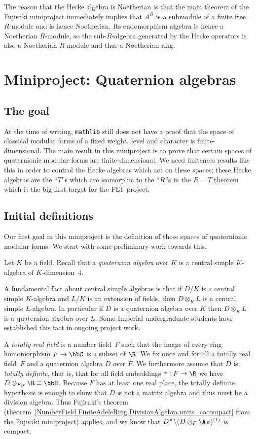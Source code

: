 The reason that the Hecke algebra is Noetherian is that the main theorem of the Fujisaki
miniproject immediately implies that $A^G$ is a submodule of a finite free $R$-module
and is hence Noetherian. Its endomorphism algebra is hence a Noetherian $R$-module,
so the sub-$R$-algebra generated by the Hecke operators is also a Noetherian $R$-module
and thus a Noetherian ring.


\chapter{Miniproject: Quaternion algebras}\label{Quat_alg_project}

\section{The goal}

At the time of writing, {\tt mathlib} still does not have a proof that the space
of classical modular forms of a fixed weight, level and character is finite-dimensional.
The main result in this miniproject is to prove that certain spaces of quaternionic modular forms
are finite-dimensional. We need finiteness results
like this in order to control the Hecke algebras which act on these spaces; these Hecke
algebras are the ``$T$''s which are isomorphic to the ``$R$''s in the $R=T$ theorem which
is the big first target for the FLT project.

\section{Initial definitions}

Our first goal in this miniproject is the definition of these spaces of quaternionic modular forms.
We start with some preliminary work towards this.

Let $K$ be a field. Recall that a \emph{quaternion algebra}
over $K$ is a central simple $K$-algebra of $K$-dimension~4.

A fundamental fact about central simple algebras is that if $D/K$
is a central simple $K$-algebra and $L/K$ is an extension of fields, then $D\otimes_KL$
is a central simple $L$-algebra. In particular if $D$ is a quaternion algebra over $K$
then $D\otimes_KL$ is a quaternion algebra over $L$. Some Imperial undergraduate students have established
this fact in ongoing project work.

A \emph{totally real field} is a number field~$F$ such that the image of every ring
homomorphism $F\to\bbC$ is a subset of $\R$. We fix once and for all a totally real field~$F$ and a
quaternion algebra $D$ over $F$. We furthermore assume that $D$ is \emph{totally definite}, that is,
that for all field embeddings $\tau:F\to\R$ we have $D\otimes_{F,\tau}\R\cong\bbH$. Because $F$
has at least one real place, the totally definite hypothesis is enough to show that $D$
is not a matrix algebra and thus must be a division algebra. Thus Fujisaki's theorem (theorem~\ref{NumberField.FiniteAdeleRing.DivisionAlgebra.units_cocompact}
from the Fujisaki miniproject) applies, and we know that $D^\times\backslash (D\otimes_F\A_F)^{(1)}$
is compact.

